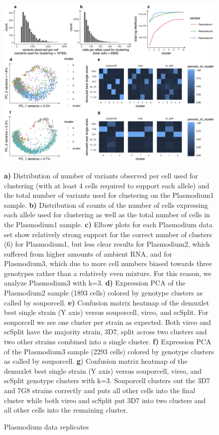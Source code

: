 \begin{figure}[htbp!]
\caption{Plasmodium data replicates}
\label{figure:malaria_replicates}
\begin{centering}

\includegraphics[width=\textwidth]{plasmodium_replicates.jpg} 
\par{\textbf{a)} Distribution of number of variants observed per cell used for clustering (with at least 4 cells required to support each allele) and the
total number of variants used for clustering on the Plasmodium1 sample. \textbf{b)} Distribution of counts of the number of cells expressing
each allele used for clustering as well as the total number of cells in the Plasmodium1 sample. \textbf{c)} Elbow plots for each Plasmodium
data set show relatively strong support for the correct number of clusters (6) for Plasmodium1, but less clear results for Plasmodium2,
which suffered from higher amounts of ambient RNA, and for Plasmodium3, which due to more cell numbers biased towards three
genotypes rather than a relatively even mixture. For this reason, we analyze Plasmodium3 with k=3. \textbf{d)} Expression PCA of the
Plasmodium2 sample (1893 cells) colored by genotype clusters as called by souporcell. \textbf{e)} Confusion matrix heatmap of the demuxlet
best single strain (Y axis) versus souporcell, vireo, and scSplit. For souporcell we see one cluster per strain as expected. Both vireo
and scSplit have the majority strain, 3D7, split across two clusters and two other strains combined into a single cluster. \textbf{f)} Expression
PCA of the Plasmodium3 sample (2293 cells) colored by genotype clusters as called by souporcell. \textbf{g}) Confusion matrix heatmap of the
demuxlet best single strain (Y axis) versus souporcell, vireo, and scSplit genotype clusters with k=3. Souporcell clusters out the 3D7
and 7G8 strains correctly and puts all other cells into the final cluster while both vireo and scSplit put 3D7 into two clusters and all other
cells into the remaining cluster.}

\end{centering}
\end{figure}




